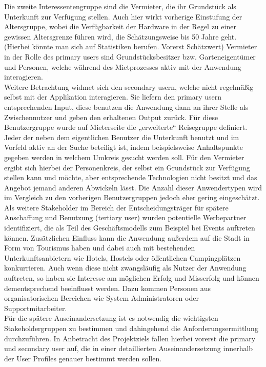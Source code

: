 Die zweite Interessentengruppe sind die Vermieter, die ihr Grundstück als Unterkunft zur Verfügung stellen. Auch hier wirkt vorherige Einstufung der Altersgruppe, wobei die Verfügbarkeit der Hardware in der Regel zu einer gewissen Altersgrenze führen wird, die Schätzungsweise bis 50 Jahre geht. (Hierbei könnte man sich auf Statistiken berufen. Vorerst Schätzwert)
Vermieter in der Rolle des primary users sind Grundstücksbesitzer bzw. Garteneigentümer und Personen, welche während des Mietprozesses aktiv mit der Anwendung interagieren.\\
 
Weitere Betrachtung widmet sich den secondary usern, welche nicht regelmäßig selbst mit der Applikation interagieren. Sie liefern den primary usern entsprechenden Input, diese benutzen die Anwendung dann an ihrer Stelle als Zwischennutzer und geben den erhaltenen Output zurück. Für diese Benutzergruppe wurde auf Mieterseite die „erweiterte“ Reisegruppe definiert. Jeder der neben dem eigentlichen Benutzer die Unterkunft benutzt und im Vorfeld aktiv an der Suche beteiligt ist, indem beispielsweise Anhaltspunkte gegeben werden in welchem Umkreis gesucht werden soll.
Für den Vermieter ergibt sich hierbei der Personenkreis, der selbst ein Grundstück zur Verfügung stellen kann und möchte, aber entsprechende Technologien nicht besitzt und das Angebot jemand anderen Abwickeln lässt. Die Anzahl dieser Anwendertypen wird im Vergleich zu den vorherigen Benutzergruppen jedoch eher gering eingeschätzt.\\
 
Als weitere Stakeholder im Bereich der Entscheidungsträger für spätere Anschaffung und Benutzung (tertiary user) wurden potentielle Werbepartner identifiziert, die als Teil des Geschäftsmodells zum Beispiel bei Events auftreten können. Zusätzlichen Einfluss kann die Anwendung außerdem auf die Stadt in Form von Tourismus haben und dabei auch mit bestehenden Unterkunftsanbietern wie Hotels, Hostels oder öffentlichen Campingplätzen konkurrieren. Auch wenn diese nicht zwangsläufig als Nutzer der Anwendung auftreten, so haben sie Interesse am möglichen Erfolg und Misserfolg und können dementsprechend beeinflusst werden.
Dazu kommen Personen aus organisatorischen Bereichen wie System Administratoren oder Supportmitarbeiter.\\
 
Für die spätere Auseinandersetzung ist es notwendig die wichtigsten Stakeholdergruppen zu bestimmen und dahingehend die Anforderungsermittlung durchzuführen.
In Anbetracht des Projektziels fallen hierbei vorerst die primary und secondary user auf, die in einer detaillierten Auseinandersetzung innerhalb der User Profiles genauer bestimmt werden sollen.
 
